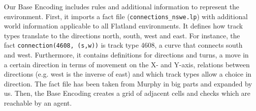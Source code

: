 \documentclass[runningheads]{llncs}
\begin{document}
Our Base Encoding includes rules and additional information to represent the environment. First, it imports a fact file (\verb|connections_nswe.lp|) with additional world information applicable to all Flatland environments. It defines how track types translate to the directions north, south, west and east. For instance, the fact \verb|connection(4608, (s,w))| is track type 4608, a curve that connects south and west. Furthermore, it contains definitions for directions and turns, a move in a certain direction in terms of movement on the X- and Y-axis, relations between directions (e.g. west is the inverse of east) and which track types allow a choice in direction. The fact file has been taken from Murphy \cite{Murphy2026a} in big parts and expanded by us. Then, the Base Encoding creates a grid of adjacent cells and checks which are reachable by an agent.
\end{document}
